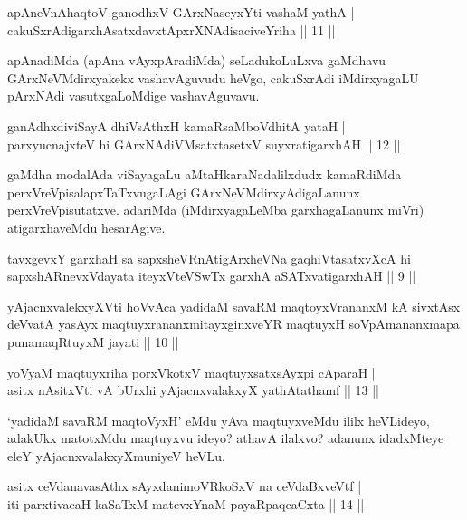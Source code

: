 \begin{shl}
apAneVnA\s \s haqtoV ganodhxV GArxNaseyxYti vashaM yathA |\\
cakuSxrAdigarxhAsatxdavxtApxrXNAdisaciveYriha \hfill || 11 ||
\end{shl}

\begin{artha}
apAnadiMda (apAna vAyxpAradiMda) seLadukoLuLxva gaMdhavu GArxNeVMdirxyakekx vashavAguvudu heVgo, cakuSxrAdi iMdirxyagaLU pArxNAdi vasutxgaLoMdige vashavAguvavu.
\end{artha}

\begin{shl}
ganAdhxdiviSayA dhiVsAthxH kamaRsaMboVdhitA yataH |\\
parxyucnajxteV hi GArxNAdiVMsatxtasetxV suyxratigarxhAH \hfill || 12 ||
\end{shl}

\begin{artha}
gaMdha modalAda viSayagaLu aMtaHkaraNadalilxdudx kamaRdiMda perxVreVpisalapxTaTxvugaLAgi GArxNeVMdirxyAdigaLanunx perxVreVpisutatxve. adariMda (iMdirxyagaLeMba garxhagaLanunx miVri) atigarxhaveMdu hesarAgive.
\end{artha}


\begin{kandikeshl}
tavxgevxY garxhaH sa sapxsheVRnAtigArxheVNa gaqhiVtasatxvXcA hi sapxshARnevxVdayata iteyxVteV\s SwTx garxhA aSATxvatigarxhAH || 9 ||

yAjacnxvalekxyXVti hoVvAca yadidaM savaRM maqtoyxVrananxM kA sivxtAsx deVvatA yasAyx maqtuyxrananxmitayxginxveYR maqtuyxH soV\s pAmananxmapa punamaqRtuyxM jayati || 10 ||
\end{kandikeshl}


\begin{shl}
yoV\s yaM maqtuyxriha porxVkotxV maqtuyxsatxsAyxpi cAparaH |\\
asitx nAsitxVti vA bUrxhi yAjacnxvalakxyX yathAtathamf \hfill || 13 ||
\end{shl}

\begin{artha}
`yadidaM savaRM maqtoVyxH' eMdu yAva maqtuyxveMdu ililx heVLideyo, adakUkx matotxMdu maqtuyxvu ideyo? athavA ilalxvo? adanunx idadxMteye eleY yAjacnxvalakxyXmuniyeV heVLu.
\end{artha}

\begin{shl}
asitx ceVdanavasAthx sAyxdanimoVRkoSxV na ceVdaBxveVtf |\\
iti parxtivacaH kaSaTxM matevxYnaM payaRpaqcaCxta \hfill || 14 ||
\end{shl}

